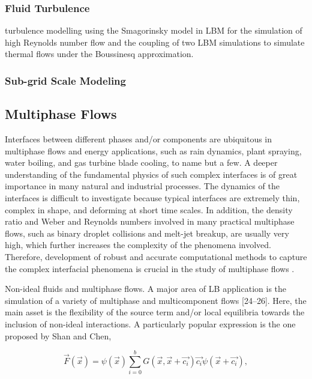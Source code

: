 \subsubsection{Fluid Turbulence}

turbulence modelling using the Smagorinsky model in LBM for the simulation of high Reynolds number flow and the coupling of two LBM simulations to simulate thermal flows under the Boussinesq approximation.

\subsubsection{Sub-grid Scale Modeling}

\subsection{Multiphase Flows}

Interfaces between different phases and/or components are ubiquitous in multiphase flows and energy applications, such as rain dynamics, plant spraying, water boiling, and gas turbine blade cooling, to name but a few. A deeper understanding of the fundamental physics of such complex interfaces is of great importance in many natural and industrial processes. The dynamics of the interfaces is difficult to investigate because typical interfaces are extremely thin, complex in shape, and deforming at short time scales. In addition, the density ratio and Weber and Reynolds numbers involved in many practical multiphase flows, such as binary droplet collisions and melt-jet breakup, are usually very high, which further increases the complexity of the phenomena involved. Therefore, development of robust and accurate computational methods to capture the complex interfacial phenomena is crucial in the study of multiphase flows \cite{feiModelingRealisticMultiphase2019}.

Non-ideal fluids and multiphase flows. 
A major area of LB application is the simulation of a variety of multiphase and multicomponent flows [24–26]. Here, the main asset is the flexibility of the source term and/or local equilibria towards the inclusion of non-ideal interactions. A particularly popular expression is the one proposed by Shan and Chen,

\begin{equation}
	\vec{F}(\vec{x}) = \psi(\vec{x}) \sum_{i=0}^{b}G(\vec{x},\vec{x}+\vec{c_i})\vec{c_i}\psi(\vec{x}+\vec{c_i}),
\end{equation}

